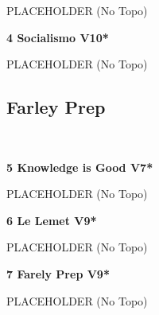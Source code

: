 \begin{multicols}{2}
\begin{minipage}{\linewidth}
					\begin{adjustwidth}{0.5cm}{}				
					PLACEHOLDER
						\newline (No Topo) 
					\end{adjustwidth}
					\end{minipage}
					\begin{minipage}{\linewidth}	
					\label{rt:Socialismo}
\colorbox{red!20}{
\textbf{
4 Socialismo V10*  
}
}

					\begin{adjustwidth}{0.5cm}{}				
					PLACEHOLDER
						\newline (No Topo) 
					\end{adjustwidth}
					\end{minipage}
			\subsection*{Farley Prep}\label{bf:Farley Prep}
			\begin{minipage}{\columnwidth}
			\
			\end{minipage}
			
					\begin{minipage}{\linewidth}	
					\label{rt:Knowledge is Good}
\colorbox{Goldenrod!50}{
\textbf{
5 Knowledge is Good V7*  
}
}

					\begin{adjustwidth}{0.5cm}{}				
					PLACEHOLDER
						\newline (No Topo) 
					\end{adjustwidth}
					\end{minipage}
					\begin{minipage}{\linewidth}	
					\label{rt:Le Lemet}
\colorbox{Goldenrod!50}{
\textbf{
6 Le Lemet V9*  
}
}

					\begin{adjustwidth}{0.5cm}{}				
					PLACEHOLDER
						\newline (No Topo) 
					\end{adjustwidth}
					\end{minipage}
					\begin{minipage}{\linewidth}	
					\label{rt:Farely Prep}
\colorbox{Goldenrod!50}{
\textbf{
7 Farely Prep V9*  
}
}

					\begin{adjustwidth}{0.5cm}{}				
					PLACEHOLDER
						\newline (No Topo) 
					\end{adjustwidth}
					\end{minipage}
\end{multicols}
\clearpage